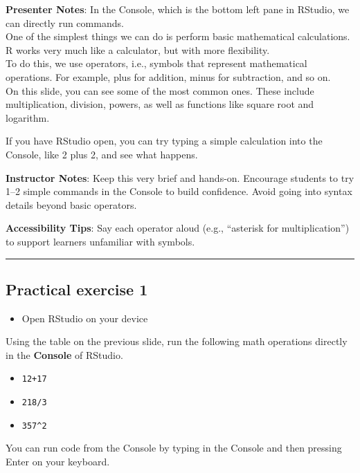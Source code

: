 \documentclass[
  letterpaper,
  DIV=11,
  numbers=noendperiod]{scrartcl}
\providecommand{\tightlist}{%
  \setlength{\itemsep}{0pt}\setlength{\parskip}{0pt}}
\begin{document}
\textbf{Presenter Notes}: In the Console, which is the bottom left pane
in RStudio, we can directly run commands.\\
One of the simplest things we can do is perform basic mathematical
calculations. R works very much like a calculator, but with more
flexibility.\\
To do this, we use operators, i.e., symbols that represent mathematical
operations. For example, plus for addition, minus for subtraction, and
so on.\\
On this slide, you can see some of the most common ones. These include
multiplication, division, powers, as well as functions like square root
and logarithm.

If you have RStudio open, you can try typing a simple calculation into
the Console, like 2 plus 2, and see what happens.

\textbf{Instructor Notes}: Keep this very brief and hands-on. Encourage
students to try 1--2 simple commands in the Console to build confidence.
Avoid going into syntax details beyond basic operators.

\textbf{Accessibility Tips}: Say each operator aloud (e.g., ``asterisk
for multiplication'') to support learners unfamiliar with symbols.

\begin{center}\rule{0.5\linewidth}{0.5pt}\end{center}

\subsection{Practical exercise 1}\label{practical-exercise-1}

\begin{itemize}
\tightlist
\item[$\square$]
  Open RStudio on your device
\end{itemize}

Using the table on the previous slide, run the following math operations
directly in the \textbf{Console} of RStudio.

\begin{itemize}
\tightlist
\item[$\square$]
  \texttt{12+17}
\item[$\square$]
  \texttt{218/3}
\item[$\square$]
  \texttt{357\^{}2}
\end{itemize}

\begin{tcolorbox}[enhanced jigsaw, arc=.35mm, bottomrule=.15mm, bottomtitle=1mm, breakable, colback=white, colbacktitle=quarto-callout-tip-color!10!white, colframe=quarto-callout-tip-color-frame, coltitle=black, left=2mm, leftrule=.75mm, opacityback=0, opacitybacktitle=0.6, rightrule=.15mm, title=\textcolor{quarto-callout-tip-color}{\faLightbulb}\hspace{0.5em}{Let's use the Console!}, titlerule=0mm, toprule=.15mm, toptitle=1mm]

You can run code from the Console by typing in the Console and then
pressing Enter on your keyboard.

\end{tcolorbox}
\end{document}

